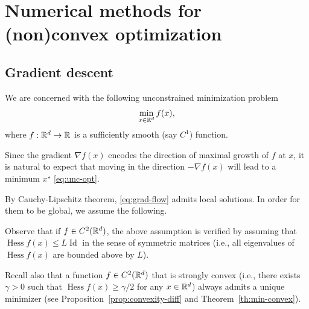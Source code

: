      \chapter{Numerical methods for (non)convex optimization}
 
     \section{Gradient descent}
 
     We are concerned with the following unconstrained minimization problem
     \begin{equation}
         \label{eq:unc-opt}
         \min_{x\in\mathbb{R}^d} f(x),
     \end{equation}
     where $f:\mathbb{R}^d\to \mathbb{R}$ is a sufficiently smooth (say $C^1$) function.
 
     Since the gradient $\nabla f(x)$ encodes the direction of maximal growth of $f$ at $x$, it is natural to expect that moving in the direction $-\nabla f(x)$ will lead to a minimum $x^\star$ \eqref{eq:unc-opt}.
 
 
     By Cauchy-Lipschitz theorem, \eqref{eq:grad-flow} admits local solutions.
     In order for them to be global, we assume the following.
 
 
     Observe that if $f\in C^2(\mathbb{R}^d)$, the above assumption is verified by assuming that $\operatorname{Hess} f(x)\le L \operatorname{Id}$ in the sense of symmetric matrices (i.e.,  all eigenvalues of $\operatorname{Hess}f(x)$ are bounded above by $L$).
 
     Recall also that a function $f\in C^2(\mathbb{R}^d)$ that is strongly convex (i.e., there exists $\gamma>0$ such that $\operatorname{Hess}f(x)\ge \gamma/2$ for any $x\in \mathbb{R}^d$) always admits a unique minimizer (see Proposition~\ref{prop:convexity-diff} and Theorem~\ref{th:min-convex}).
 
